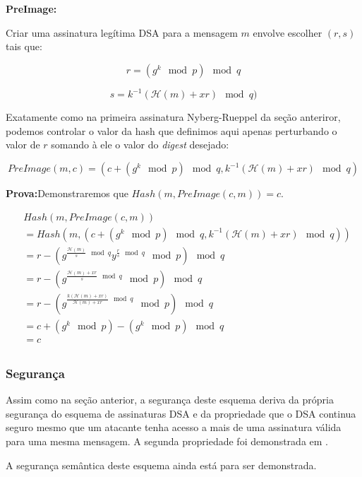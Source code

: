 \documentclass[a4paper]{article}
\begin{document}
    \textbf{PreImage:}
    
    Criar uma assinatura legítima DSA para a mensagem $m$ envolve escolher
    $(r, s)$ tais que:
    
    $$
    r = (g^k \mod p) \mod q
    $$
    
    $$
    s = k^{-1}(\mathcal{H}(m)+xr) \mod q)
    $$
    
    Exatamente como na primeira assinatura Nyberg-Rueppel da seção
    anteriror, podemos controlar o valor da hash que definimos aqui apenas
    perturbando o valor de $r$ somando à ele o valor do \textit{digest}
    desejado:
    
    $$
    PreImage(m, c) = (c + (g^k \mod p) \mod q,k^{-1}(\mathcal{H}(m)+xr) \mod q)
    $$
    
    \textbf{Prova:}Demonstraremos que $Hash(m, PreImage(c, m)) = c$.
    
    \begin{equation*}
      \begin{split}
        &Hash(m, PreImage(c, m))\\
        &= Hash(m, (c + (g^k \mod p) \mod q, k^{-1}(\mathcal{H}(m)+xr) \mod q))\\
        &= r - (g^{\frac{\mathcal{H}(m)}{s} \mod q}y^{\frac{r}{s} \mod q} \mod p) \mod q\\
        &= r - (g^{\frac{\mathcal{H}(m)+xr}{s} \mod q} \mod p) \mod q\\
        &= r - (g^{\frac{k(\mathcal{H}(m)+xr)}{\mathcal{H}(m)+xr} \mod q} \mod p) \mod q\\
        &= c + (g^k \mod p) - (g^{k} \mod p) \mod q\\
        &= c\\
        \end{split}
    \end{equation*}
    
    \subsubsection{Segurança}
    
    Assim como na seção anterior, a segurança deste esquema deriva da
    própria segurança do esquema de assinaturas DSA e da propriedade que o
    DSA continua seguro mesmo que um atacante tenha acesso a mais de uma
    assinatura válida para uma mesma mensagem. A segunda propriedade foi
    demonstrada em \cite{twin}.
    
    A segurança semântica deste esquema ainda está para ser demonstrada.
    
\end{document}
